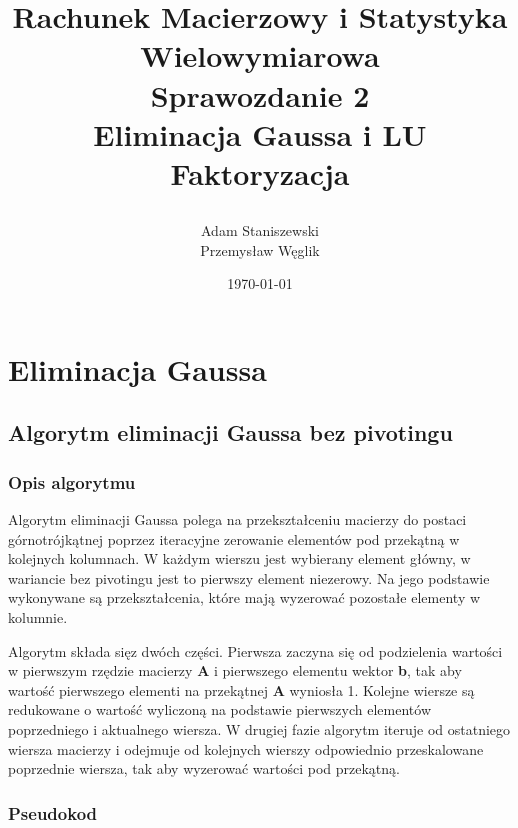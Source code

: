 \documentclass[12pt,a4paper,table]{article}
\begin{document}
    \title {
        Rachunek Macierzowy i Statystyka Wielowymiarowa \\
        Sprawozdanie 2 \\
        Eliminacja Gaussa i LU Faktoryzacja

    }

    \author{
        Adam Staniszewski \\
        Przemysław Węglik
    }

    \date{\today}

    \maketitle

    \tableofcontents
    \newpage

    \section{Eliminacja Gaussa}

    \subsection{Algorytm eliminacji Gaussa bez pivotingu}
    \subsubsection{Opis algorytmu}
    Algorytm eliminacji Gaussa polega na przekształceniu macierzy do postaci górnotrójkątnej poprzez iteracyjne zerowanie elementów pod przekątną w kolejnych kolumnach. W każdym wierszu jest wybierany element główny, w wariancie bez pivotingu jest to pierwszy element niezerowy. Na jego podstawie wykonywane są przekształcenia, które mają wyzerować pozostałe elementy w kolumnie. 

    Algorytm składa sięz dwóch części. Pierwsza zaczyna się od podzielenia wartości w pierwszym rzędzie macierzy \textbf{A} i pierwszego elementu wektor \textbf{b}, tak aby wartość pierwszego elementi na przekątnej \textbf{A} wyniosła 1. Kolejne wiersze są redukowane o wartość wyliczoną na podstawie pierwszych elementów poprzedniego i aktualnego wiersza. 
    W drugiej fazie algorytm iteruje od ostatniego wiersza macierzy i odejmuje od kolejnych wierszy odpowiednio przeskalowane poprzednie wiersza, tak aby wyzerować wartości pod przekątną.

    \subsubsection{Pseudokod}
\end{document}
